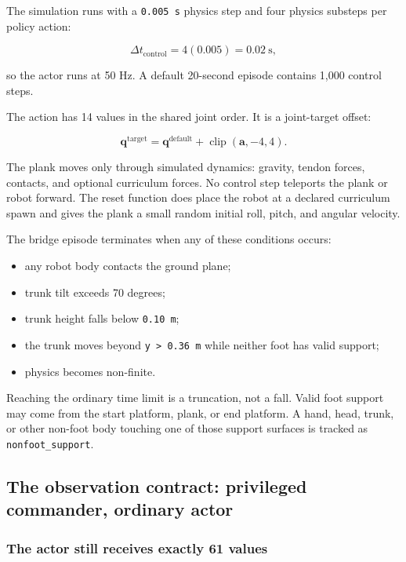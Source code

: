 \documentclass[
  american,
  11pt,
  letterpaper,
]{article}
\providecommand{\tightlist}{%
  \setlength{\itemsep}{0pt}\setlength{\parskip}{0pt}}
\begin{document}
The simulation runs with a \texttt{0.005\ s} physics step and four
physics substeps per policy action:

\[
\Delta t_{\text{control}}=4(0.005)=0.02\ \text{s},
\]

so the actor runs at 50 Hz. A default 20-second episode contains 1,000
control steps.

The action has 14 values in the shared joint order. It is a joint-target
offset:

\[
\mathbf q^{\text{target}}
=\mathbf q^{\text{default}}+\operatorname{clip}(\mathbf a,-4,4).
\]

The plank moves only through simulated dynamics: gravity, tendon forces,
contacts, and optional curriculum forces. No control step teleports the
plank or robot forward. The reset function does place the robot at a
declared curriculum spawn and gives the plank a small random initial
roll, pitch, and angular velocity.

The bridge episode terminates when any of these conditions occurs:

\begin{itemize}
\tightlist
\item
  any robot body contacts the ground plane;
\item
  trunk tilt exceeds 70 degrees;
\item
  trunk height falls below \texttt{0.10\ m};
\item
  the trunk moves beyond
  \texttt{\textbar{}y\textbar{}\ \textgreater{}\ 0.36\ m} while neither
  foot has valid support;
\item
  physics becomes non-finite.
\end{itemize}

Reaching the ordinary time limit is a truncation, not a fall. Valid foot
support may come from the start platform, plank, or end platform. A
hand, head, trunk, or other non-foot body touching one of those support
surfaces is tracked as \texttt{nonfoot\_\allowbreak{}support}.

\subsection{The observation contract: privileged commander, ordinary
actor}\label{the-observation-contract-privileged-commander-ordinary-actor}

\subsubsection{The actor still receives exactly 61
values}\label{the-actor-still-receives-exactly-61-values}
\end{document}
